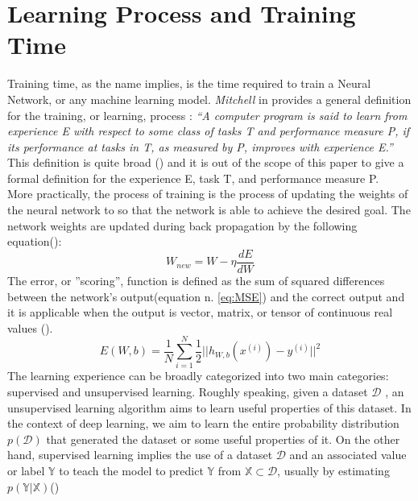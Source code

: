\section{Learning Process and Training Time}\label{sec:training_time}
Training time, as the name implies, is the time required to train a Neural Network, or any machine learning model. \textit{Mitchell} in \cite{machine_learning} provides a general definition for the training, or learning, process : \textit{“A computer program is said to learn from experience E with respect to some class of tasks T and performance measure P, if its performance at tasks in T, as measured by P, improves with experience E.”} This definition is quite broad (\cite{Goodfellow-et-al-2016}) and it is out of the scope of this paper to give a formal definition for the experience E, task T, and performance measure P.\\More practically, the process of training is the process of updating the weights of the neural network to so that the network is able to achieve the desired goal. \cite{murphy2016overview} The network weights are updated during back propagation by the following equation(\cite{murphy2016overview}):
\begin{equation}
W_{new} = W - \eta \frac{dE}{dW}
\end{equation}
The error, or ''scoring'', function is defined as the sum of squared differences between the network's output(equation n. \ref{eq:MSE}) and the correct output and it is applicable when the output is vector, matrix, or tensor of continuous real values (\cite{murphy2016overview}). 
\begin{equation}
E(W,b) = \frac{1}{N} \sum_{i=1}^{N} \frac{1}{2} \vert \vert h_{W,b} (x^{(i)}) - y^{(i)} \vert \vert ^{2}
\label{eq:MSE}
\end{equation}
The learning experience can be broadly categorized into two main categories: supervised and unsupervised learning. Roughly speaking, given a dataset $\mathcal{D}$ , an unsupervised learning algorithm aims to learn useful properties of this dataset. In the context of deep learning, we aim to learn the entire probability distribution $p(\mathcal{D})$ that generated the dataset or some useful properties of it. On the other hand, supervised learning implies the use of a dataset $\mathcal{D}$ and an associated value or label $\mathbb{Y}$ to teach the model to predict $\mathbb{Y}$ from $\mathbb{X} \subset \mathcal{D}$, usually by estimating $p(\mathbb{Y} \vert \mathbb{X})$(\cite{murphy2016overview})\\
